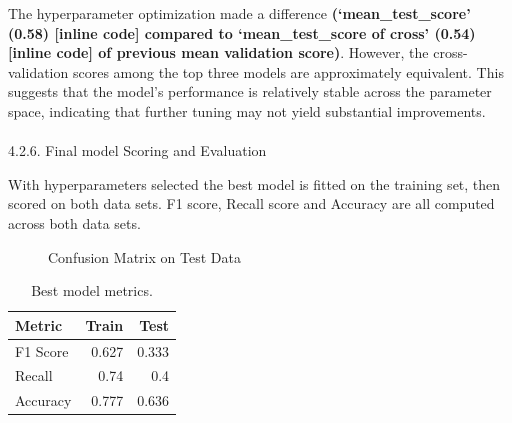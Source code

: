 \documentclass[
  letterpaper,
  DIV=11,
  numbers=noendperiod]{scrartcl}
\makeatletter
\let\oldparagraph\paragraph
\renewcommand{\paragraph}{
    \@ifstar
      \xxxParagraphStar
      \xxxParagraphNoStar
  }
\newcommand{\xxxParagraphStar}[1]{\oldparagraph*{#1}\mbox{}}
\newcommand{\xxxParagraphNoStar}[1]{\oldparagraph{#1}\mbox{}}
\makeatother
\begin{document}
The hyperparameter optimization made a difference
\textbf{(`mean\_test\_score' (0.58) {[}inline code{]} compared to
`mean\_test\_score of cross' (0.54) {[}inline code{]} of previous mean
validation score)}. However, the cross-validation scores among the top
three models are approximately equivalent. This suggests that the
model's performance is relatively stable across the parameter space,
indicating that further tuning may not yield substantial improvements.

\paragraph{4.2.6. Final model Scoring and
Evaluation}\label{final-model-scoring-and-evaluation}

With hyperparameters selected the best model is fitted on the training
set, then scored on both data sets. F1 score, Recall score and Accuracy
are all computed across both data sets.

\begin{figure}


\caption{\label{fig-conf-mat}Confusion Matrix on Test Data}

\end{figure}%

\begin{longtable}[]{@{}lrr@{}}

\caption{\label{tbl-model-results}Best model metrics.}

\tabularnewline

\toprule\noalign{}
Metric & Train & Test \\
\midrule\noalign{}
\endhead
\bottomrule\noalign{}
\endlastfoot
F1 Score & 0.627 & 0.333 \\
Recall & 0.74 & 0.4 \\
Accuracy & 0.777 & 0.636 \\

\end{longtable}
\end{document}
